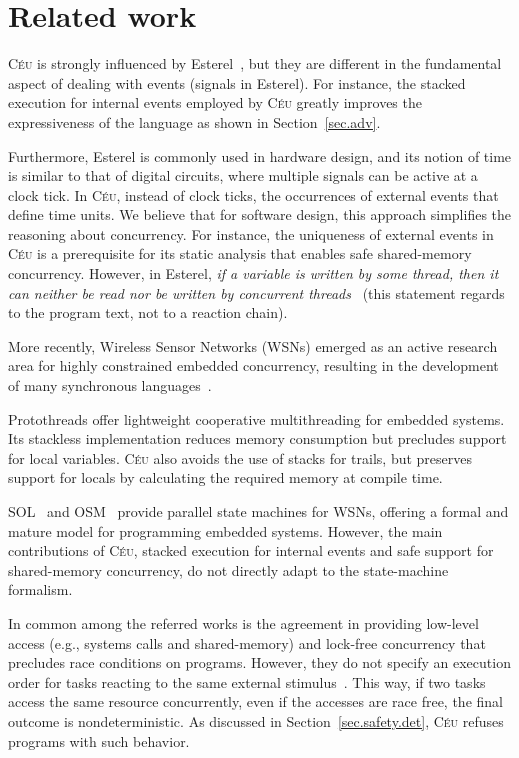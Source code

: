 \documentclass[preprint]{sigplanconf}
\newcommand{\CEU}{\textsc{C\'{e}u}\xspace}
\newcommand{\1}{\;}
\newcommand{\2}{\;\;}
\newcommand{\3}{\;\;\;}
\newcommand{\5}{\;\;\;\;\;}
\begin{document}
\section{Related work}
\label{sec.related}

\CEU is strongly influenced by Esterel~\cite{esterel.ieee91}, but they are 
different in the fundamental aspect of dealing with events (signals in 
Esterel).
For instance, the stacked execution for internal events employed by \CEU 
greatly improves the expressiveness of the language as shown in 
Section~\ref{sec.adv}.

Furthermore, Esterel is commonly used in hardware design, and its notion of 
time is similar to that of digital circuits, where multiple signals can be 
active at a clock tick.
In \CEU, instead of clock ticks, the occurrences of external events that define 
time units.
We believe that for software design, this approach simplifies the reasoning 
about concurrency.
For instance, the uniqueness of external events in \CEU is a prerequisite for 
its static analysis that enables safe shared-memory concurrency.
However, in Esterel, \emph{if a variable is written by some thread, then it can 
neither be read nor be written by concurrent threads}~\cite{esterel.primer} 
(this statement regards to the program text, not to a reaction chain).

More recently, Wireless Sensor Networks (WSNs) emerged as an active research 
area for highly constrained embedded concurrency, resulting in the development 
of many synchronous languages~\cite{wsn.protothreads,wsn.sol,wsn.osm}.

Protothreads \cite{wsn.protothreads} offer lightweight cooperative 
multithreading for embedded systems.
Its stackless implementation reduces memory consumption but precludes support 
for local variables.
\CEU also avoids the use of stacks for trails, but preserves support for locals 
by calculating the required memory at compile time.

SOL~\cite{wsn.sol} and OSM~\cite{wsn.osm} provide parallel state machines for 
WSNs, offering a formal and mature model for programming embedded systems.
However, the main contributions of \CEU, stacked execution for internal 
events and safe support for shared-memory concurrency, do not directly adapt to 
the state-machine formalism.

In common among the referred works is the agreement in providing low-level 
access (e.g., systems calls and shared-memory) and lock-free concurrency that 
precludes race conditions on programs.
However, they do not specify an execution order for tasks reacting to the same 
external stimulus~\cite{esterel.primer,wsn.protothreads,wsn.osm}.
This way, if two tasks access the same resource concurrently, even if the 
accesses are race free, the final outcome is nondeterministic.
As discussed in Section~\ref{sec.safety.det}, \CEU refuses programs with such 
behavior.
\end{document}
